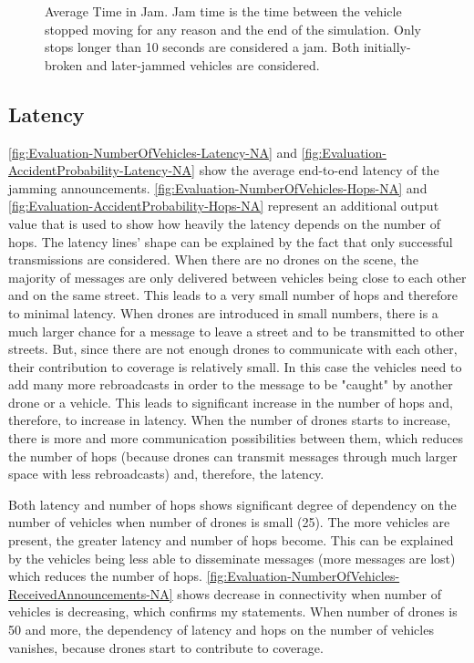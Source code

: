 \documentclass[]{nsm-thesis}
\begin{document}
\begin{figure}%
	\centering
	\hfill
	\hfill
	\caption{Average Time in Jam. Jam time is the time between the vehicle stopped moving for any reason and the end of the simulation. Only stops longer than 10 seconds are considered a jam. Both initially-broken and later-jammed vehicles are considered.}%
	\label{fig:Evaluation-JamTime}%
\end{figure}



\subsection{Latency}

\cref{fig:Evaluation-NumberOfVehicles-Latency-NA} and \cref{fig:Evaluation-AccidentProbability-Latency-NA} show the average end-to-end latency of the jamming announcements. \cref{fig:Evaluation-NumberOfVehicles-Hops-NA} and \cref{fig:Evaluation-AccidentProbability-Hops-NA} represent an additional output value that is used to show how heavily the latency depends on the number of hops. The latency lines' shape can be explained by the fact that only successful transmissions are considered. When there are no drones on the scene, the majority of messages are only delivered between vehicles being close to each other and on the same street. This leads to a very small number of hops and therefore to minimal latency. When drones are introduced in small numbers, there is a much larger chance for a message to leave a street and to be transmitted to other streets. But, since there are not enough drones to communicate with each other, their contribution to coverage is relatively small. In this case the vehicles need to add many more rebroadcasts in order to the message to be "caught" by another drone or a vehicle. This leads to significant increase in the number of hops and, therefore, to increase in latency. When the number of drones starts to increase, there is more and more communication possibilities between them, which reduces the number of hops (because drones can transmit messages through much larger space with less rebroadcasts) and, therefore, the latency.

Both latency and number of hops shows significant degree of dependency on the number of vehicles when number of drones is small (25). The more vehicles are present, the greater latency and number of hops become. This can be explained by the vehicles being less able to disseminate messages (more messages are lost) which reduces the number of hops. \cref{fig:Evaluation-NumberOfVehicles-ReceivedAnnouncements-NA} shows decrease in connectivity when number of vehicles is decreasing, which confirms my statements. When number of drones is 50 and more, the dependency of latency and hops on the number of vehicles vanishes, because drones start to contribute to coverage. 
\end{document}
